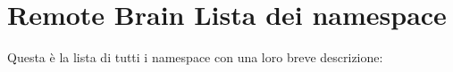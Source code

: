 \section{Remote Brain Lista dei namespace}
Questa \`{e} la lista di tutti i namespace con una loro breve descrizione:\begin{CompactList}
\item{}
\end{CompactList}
